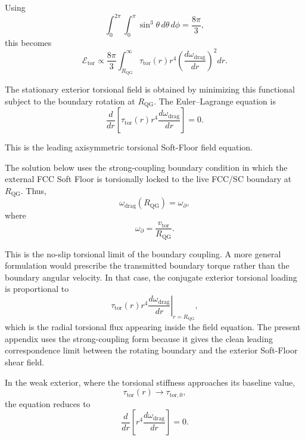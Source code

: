 Using
\begin{equation}
    \int_0^{2\pi}
    \int_0^\pi
    \sin^3\theta
    \,d\theta\,d\phi
    =
    \frac{8\pi}{3},
\end{equation}
this becomes
\begin{equation}
    \mathcal{E}_{\mathrm{tor}}
    \propto
    \frac{8\pi}{3}
    \int_{R_{\mathrm{QG}}}^{\infty}
    \tau_{\mathrm{tor}}(r)
    r^4
    \left(
    \frac{d\omega_{\mathrm{drag}}}{dr}
    \right)^2
    dr .
\end{equation}

The stationary exterior torsional field is obtained by minimizing this functional subject to the boundary rotation at \(R_{\mathrm{QG}}\). The Euler--Lagrange equation is
\begin{equation}
    \frac{d}{dr}
    \left[
    \tau_{\mathrm{tor}}(r)
    r^4
    \frac{d\omega_{\mathrm{drag}}}{dr}
    \right]
    =
    0 .
\end{equation}

This is the leading axisymmetric torsional Soft-Floor field equation.

The solution below uses the strong-coupling boundary condition in which the external FCC Soft Floor is torsionally locked to the live FCC/SC boundary at \(R_{\mathrm{QG}}\). Thus,
\begin{equation}
    \omega_{\mathrm{drag}}(R_{\mathrm{QG}})
    =
    \omega_{\partial},
\end{equation}
where
\begin{equation}
    \omega_{\partial}
    =
    \frac{v_{\mathrm{tor}}}{R_{\mathrm{QG}}}.
\end{equation}

This is the no-slip torsional limit of the boundary coupling. A more general formulation would prescribe the transmitted boundary torque rather than the boundary angular velocity. In that case, the conjugate exterior torsional loading is proportional to
\begin{equation}
    \left.
    \tau_{\mathrm{tor}}(r)
    r^4
    \frac{d\omega_{\mathrm{drag}}}{dr}
    \right|_{r=R_{\mathrm{QG}}},
\end{equation}
which is the radial torsional flux appearing inside the field equation. The present appendix uses the strong-coupling form because it gives the clean leading correspondence limit between the rotating boundary and the exterior Soft-Floor shear field.

In the weak exterior, where the torsional stiffness approaches its baseline value,
\begin{equation}
    \tau_{\mathrm{tor}}(r)\rightarrow \tau_{\mathrm{tor},0},
\end{equation}
the equation reduces to
\begin{equation}
    \frac{d}{dr}
    \left[
    r^4
    \frac{d\omega_{\mathrm{drag}}}{dr}
    \right]
    =
    0 .
\end{equation}

